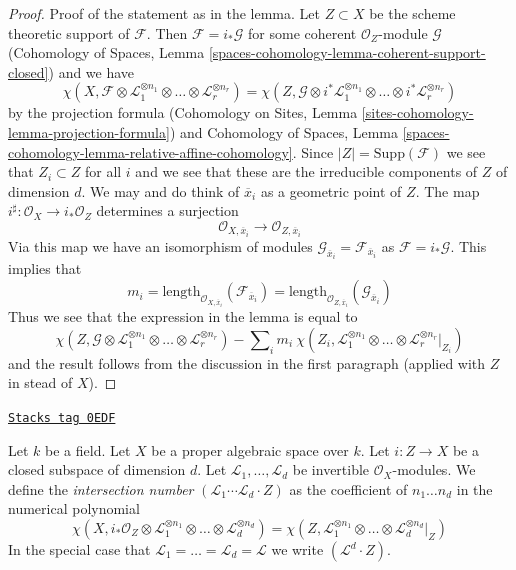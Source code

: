 \begin{proof}
\medskip\noindent
Proof of the statement as in the lemma.
Let $Z \subset X$ be the scheme theoretic support of $\mathcal{F}$.
Then $\mathcal{F} = i_*\mathcal{G}$ for some coherent
$\mathcal{O}_Z$-module $\mathcal{G}$
(Cohomology of Spaces, Lemma
\ref{spaces-cohomology-lemma-coherent-support-closed})
and we have
$$
\chi(X, \mathcal{F} \otimes
\mathcal{L}_1^{\otimes n_1} \otimes \ldots \otimes
\mathcal{L}_r^{\otimes n_r}) =
\chi(Z, \mathcal{G} \otimes
i^*\mathcal{L}_1^{\otimes n_1} \otimes \ldots \otimes
i^*\mathcal{L}_r^{\otimes n_r})
$$
by the projection formula
(Cohomology on Sites, Lemma \ref{sites-cohomology-lemma-projection-formula})
and Cohomology of Spaces, Lemma
\ref{spaces-cohomology-lemma-relative-affine-cohomology}.
Since $|Z| = \text{Supp}(\mathcal{F})$ we see that $Z_i \subset Z$
for all $i$ and we see that these are the irreducible components
of $Z$ of dimension $d$. We may and do think of $\overline{x}_i$
as a geometric point of $Z$. The map
$i^\sharp : \mathcal{O}_X \to i_*\mathcal{O}_Z$
determines a surjection
$$
\mathcal{O}_{X, \overline{x}_i} \to \mathcal{O}_{Z, \overline{x}_i}
$$
Via this map we have an isomorphism of modules
$\mathcal{G}_{\overline{x}_i} = \mathcal{F}_{\overline{x}_i}$
as $\mathcal{F} = i_*\mathcal{G}$. This implies that
$$
m_i = \text{length}_{\mathcal{O}_{X, \overline{x}_i}}
(\mathcal{F}_{\overline{x}_i}) =
\text{length}_{\mathcal{O}_{Z, \overline{x}_i}}
(\mathcal{G}_{\overline{x}_i})
$$
Thus we see that the expression in the lemma is equal to
$$
\chi(Z, \mathcal{G} \otimes \mathcal{L}_1^{\otimes n_1} \otimes \ldots \otimes
\mathcal{L}_r^{\otimes n_r}) -
\sum\nolimits_i
m_i\ \chi(Z_i, \mathcal{L}_1^{\otimes n_1} \otimes \ldots \otimes
\mathcal{L}_r^{\otimes n_r}|_{Z_i})
$$
and the result follows from the discussion in the first paragraph
(applied with $Z$ in stead of $X$).
\end{proof}

\begin{definition}
\label{spaces-over-fields-definition-intersection-number}
\href{https://stacks.math.columbia.edu/tag/0EDF}{\texttt{Stacks tag 0EDF}}

Let $k$ be a field. Let $X$ be a proper algebraic space over $k$. Let
$i : Z \to X$ be a closed subspace of dimension $d$. Let
$\mathcal{L}_1, \ldots, \mathcal{L}_d$ be invertible
$\mathcal{O}_X$-modules. We define the {\it intersection number}
$(\mathcal{L}_1 \cdots \mathcal{L}_d \cdot Z)$
as the coefficient of $n_1 \ldots n_d$ in the numerical polynomial
$$
\chi(X, i_*\mathcal{O}_Z \otimes \mathcal{L}_1^{\otimes n_1} \otimes
\ldots \otimes \mathcal{L}_d^{\otimes n_d}) =
\chi(Z, \mathcal{L}_1^{\otimes n_1} \otimes
\ldots \otimes \mathcal{L}_d^{\otimes n_d}|_Z)
$$
In the special
case that $\mathcal{L}_1 = \ldots = \mathcal{L}_d = \mathcal{L}$
we write $(\mathcal{L}^d \cdot Z)$.
\end{definition}

